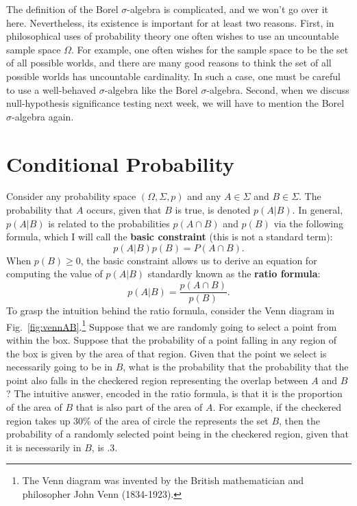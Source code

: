 \documentclass[11pt]{article}
\theoremstyle{definition}
\theoremstyle{remark}
\begin{document}
The definition of the Borel $\sigma$-algebra is complicated, and we won't go over it here. Nevertheless, its existence is important for at least two reasons. First, in philosophical uses of probability theory one often wishes to use an uncountable sample space $\Omega$. For example, one often wishes for the sample space to be the set of all possible worlds, and there are many good reasons to think the set of all possible worlds has uncountable cardinality. In such a case, one must be careful to use a well-behaved $\sigma$-algebra like the Borel $\sigma$-algebra. Second, when we discuss null-hypothesis significance testing next week, we will have to mention the Borel $\sigma$-algebra again. 


\section{Conditional Probability}
Consider any probability space $(\Omega,\Sigma,p)$ and any $A\in\Sigma$ and $B\in\Sigma$. The probability that $A$ occurs, given that $B$ is true, is denoted $p(A|B)$. In general, $p(A|B)$ is related to the probabilities $p(A\cap B)$ and $p(B)$ via the following formula, which I will call the \textbf{basic constraint} (this is not a standard term):
$$p(A|B)p(B) = P(A\cap B).$$
When $p(B)\geq 0$, the basic constraint allows us to derive an equation for computing the value of $p(A|B)$ standardly known as the \textbf{ratio formula}:\ 
$$p(A|B) = \frac{p(A\cap B)}{p(B)}.$$
To grasp the intuition behind the ratio formula, consider the Venn diagram in Fig.~\ref{fig:vennAB}.\footnote{The Venn diagram was invented by the British mathematician and philosopher John Venn (1834-1923).} Suppose that we are randomly going to select a point from within the box. Suppose that the probability of a point falling in any region of the box is given by the area of that region. Given that the point we select is necessarily going to be in $B$, what is the probability that the probability that the point also falls in the checkered region representing the overlap between $A$ and $B$? The intuitive answer, encoded in the ratio formula, is that it is the proportion of the area of $B$ that is also part of the area of $A$. For example, if the checkered region takes up 30\% of the area of circle the represents the set $B$, then the probability of a randomly selected point being in the checkered region, given that it is necessarily in $B$, is $.3$.
\end{document}
